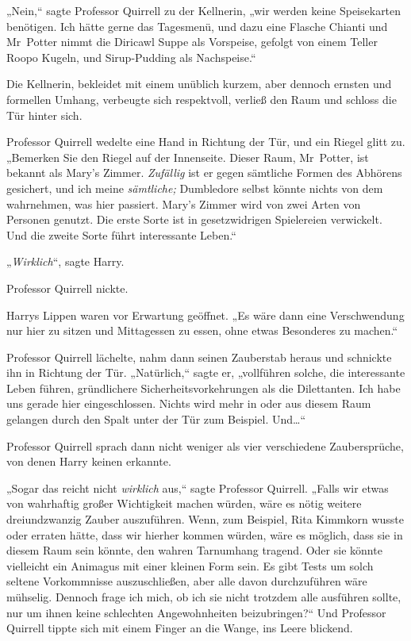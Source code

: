{„Nein,“ sagte Professor Quirrell zu der Kellnerin, „wir werden keine Speisekarten benötigen. Ich hätte gerne das Tagesmenü, und dazu eine Flasche Chianti und Mr~Potter nimmt die Diricawl Suppe als Vorspeise, gefolgt von einem Teller Roopo Kugeln, und Sirup-Pudding als Nachspeise.“

Die Kellnerin, bekleidet mit einem unüblich kurzem, aber dennoch ernsten und formellen Umhang, verbeugte sich respektvoll, verließ den Raum und schloss die Tür hinter sich.

Professor Quirrell wedelte eine Hand in Richtung der Tür, und ein Riegel glitt zu. „Bemerken Sie den Riegel auf der Innenseite. Dieser Raum, Mr~Potter, ist bekannt als Mary's Zimmer. \emph{Zufällig} ist er gegen sämtliche Formen des Abhörens gesichert, und ich meine \emph{sämtliche;} Dumbledore selbst könnte nichts von dem wahrnehmen, was hier passiert. Mary's Zimmer wird von zwei Arten von Personen genutzt. Die erste Sorte ist in gesetzwidrigen Spielereien verwickelt. Und die zweite Sorte führt interessante Leben.“

„\emph{Wirklich}“, sagte Harry.

Professor Quirrell nickte.

Harrys Lippen waren vor Erwartung geöffnet. „Es wäre dann eine Verschwendung nur hier zu sitzen und Mittagessen zu essen, ohne etwas Besonderes zu machen.“

Professor Quirrell lächelte, nahm dann seinen Zauberstab heraus und schnickte ihn in Richtung der Tür. „Natürlich,“ sagte er, „vollführen solche, die interessante Leben führen, gründlichere Sicherheitsvorkehrungen als die Dilettanten. Ich habe uns gerade hier eingeschlossen. Nichts wird mehr in oder aus diesem Raum gelangen \later durch den Spalt unter der Tür zum Beispiel. Und…“

Professor Quirrell sprach dann nicht weniger als vier verschiedene Zaubersprüche, von denen Harry keinen erkannte.

„Sogar das reicht nicht \emph{wirklich} aus,“ sagte Professor Quirrell. „Falls wir etwas von wahrhaftig großer Wichtigkeit machen würden, wäre es nötig weitere dreiundzwanzig Zauber auszuführen. Wenn, zum Beispiel, Rita Kimmkorn wusste oder erraten hätte, dass wir hierher kommen würden, wäre es möglich, dass sie in diesem Raum sein könnte, den wahren Tarnumhang tragend. Oder sie könnte vielleicht ein Animagus mit einer kleinen Form sein. Es gibt Tests um solch seltene Vorkommnisse auszuschließen, aber alle davon durchzuführen wäre mühselig. Dennoch frage ich mich, ob ich sie nicht trotzdem alle ausführen sollte, nur um ihnen keine schlechten Angewohnheiten beizubringen?“ Und Professor Quirrell tippte sich mit einem Finger an die Wange, ins Leere blickend.

}
